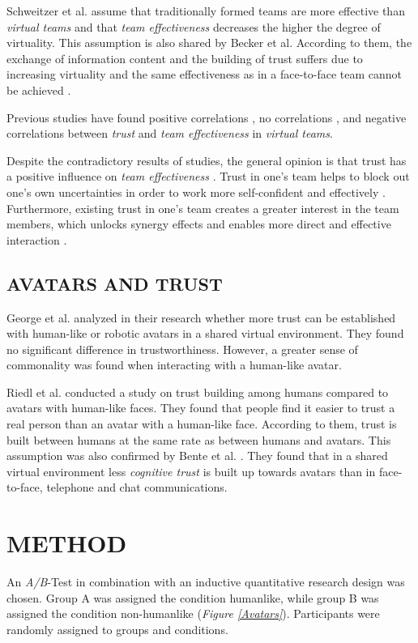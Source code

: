 \documentclass[sigchi]{acmart}
\begin{document}
Schweitzer et al. \citep{schweitzer2010conceptualizing} assume that traditionally formed teams are more effective than \textit{virtual teams} and that \textit{team effectiveness} decreases the higher the degree of virtuality.
This assumption is also shared by Becker et al. According to them, the exchange of information content and the building of trust suffers due to increasing virtuality and the same effectiveness as in a face-to-face team cannot be achieved \citep{handke2019alles}.

Previous studies have found positive correlations \citep{davis2000trusted}, no correlations \citep{hertel2004managing}, and negative correlations \citep{dirks1999effects} between \textit{trust} and \textit{team effectiveness} in \textit{virtual teams}.

Despite the contradictory results of studies, the general opinion is that trust has a positive influence on \textit{team effectiveness} \citep{de2016trust}. 
Trust in one's team helps to block out one's own uncertainties in order to work more self-confident and effectively \citep{de2010does}. Furthermore, existing trust in one's team creates a greater interest in the team members, which unlocks synergy effects and enables more direct and effective interaction \citep{dirks1999effects}. 

\subsection{AVATARS AND TRUST}
George et al. \citep{george2018trusting} analyzed in their research whether more trust can be established with human-like or robotic avatars in a shared virtual environment. They found no significant difference in trustworthiness. However, a greater sense of commonality was found when interacting with a human-like avatar.

Riedl et al. \citep{riedl2014trusting} conducted a study on trust building among humans compared to avatars with human-like faces. They found that people find it easier to trust a real person than an avatar with a human-like face. According to them, trust is built between humans at the same rate as between humans and avatars.
This assumption was also confirmed by Bente et al. \citep[p. 54-59]{bente2004social}. They found that in a shared virtual environment less \textit{cognitive trust} is built up towards avatars than in face-to-face, telephone and chat communications.

\section{METHOD}
An \textit{A/B}-Test in combination with an inductive quantitative research design was chosen.
Group A was assigned the condition humanlike, while group B was assigned the condition non-humanlike (\textit{Figure \ref{Avatars}}). Participants were randomly assigned to groups and conditions. 
\end{document}
